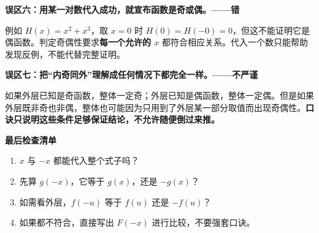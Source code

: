 \clearpage
\begin{trapbox}
\textbf{\textcolor{CTrap}{误区六：用某一对数代入成功，就宣布函数是奇或偶。——错}}


例如 $H(x)=x^2+x^3$，取 $x=0$ 时 $H(0)=H(-0)=0$，但这不能证明它是偶函数。判定奇偶性要求\textbf{每一个允许的 $x$} 都符合相应关系。代入一个数只能帮助发现反例，不能代替完整证明。

\medskip

\end{trapbox}
\clearpage
\begin{trapbox}
\textbf{\textcolor{CTrap}{误区七：把“内奇同外”理解成任何情况下都完全一样。——不严谨}}


如果外层已知是奇函数，整体一定奇；外层已知是偶函数，整体一定偶。但是如果外层既非奇也非偶，整体也可能因为只用到了外层某一部分取值而出现奇偶性。\textbf{口诀只说明这些条件足够保证结论，不允许随便倒过来推。}

\medskip
\textbf{\textcolor{CTrap}{最后检查清单}}
\begin{enumerate}[leftmargin=2.2em,itemsep=0.2em]
\item $x$ 与 $-x$ 都能代入整个式子吗？
\item 先算 $g(-x)$，它等于 $g(x)$，还是 $-g(x)$？
\item 如需看外层，$f(-u)$ 等于 $f(u)$ 还是 $-f(u)$？
\item 如果都不符合，直接写出 $F(-x)$ 进行比较，不要强套口诀。
\end{enumerate}
\end{trapbox}
